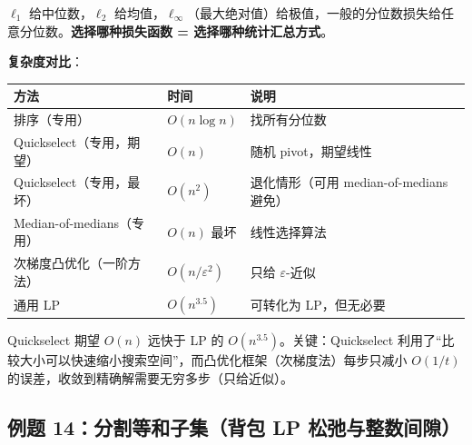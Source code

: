 \documentclass[12pt, a4paper]{ctexart}
\begin{document}
\begin{blackboard}
\begin{insight}[不同损失函数对应不同统计量]
$\ell_1$ 给中位数，$\ell_2$ 给均值，$\ell_\infty$（最大绝对值）给极值，一般的分位数损失给任意分位数。\textbf{选择哪种损失函数 = 选择哪种统计汇总方式}。
\end{insight}

\textbf{复杂度对比}：

\begin{center}
\begin{tabular}{lll}
\toprule
方法 & 时间 & 说明 \\
\midrule
排序（专用） & $O(n\log n)$ & 找所有分位数 \\
Quickselect（专用，期望） & $O(n)$ & 随机 pivot，期望线性 \\
Quickselect（专用，最坏） & $O(n^2)$ & 退化情形（可用 median-of-medians 避免） \\
Median-of-medians（专用） & $O(n)$ 最坏 & 线性选择算法 \\
次梯度凸优化（一阶方法） & $O(n/\varepsilon^2)$ & 只给 $\varepsilon$-近似 \\
通用 LP & $O(n^{3.5})$ & 可转化为 LP，但无必要 \\
\bottomrule
\end{tabular}
\end{center}

Quickselect 期望 $O(n)$ 远快于 LP 的 $O(n^{3.5})$。关键：Quickselect 利用了``比较大小可以快速缩小搜索空间''，而凸优化框架（次梯度法）每步只减小 $O(1/t)$ 的误差，收敛到精确解需要无穷多步（只给近似）。

\end{blackboard}

\subsection{例题 14：分割等和子集（背包 LP 松弛与整数间隙）}
\end{document}
